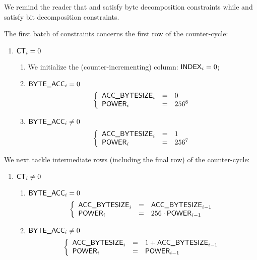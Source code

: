 \begin{center}
\end{center}

We remind the reader that
\genByte{} and \genByteAcc{} satisfy byte decomposition constraints while
\genBit{}  and \genBitAcc{}  satisfy bit  decomposition constraints.

The first batch of constraints concerns the first row of the counter-cycle:
\begin{enumerate}
	\item \If $\textsf{CT}_{i}=0$ \Then
		\begin{enumerate}
			\item We initialize the (counter-incrementing) \index{} column: \( \textsf{INDEX}_{i} = 0 \);
			\item \If $\textsf{BYTE}\textsf{\_}\textsf{ACC}_{i} = 0$ \Then 
				\[
					\left\{ \begin{array}{lcl}
						\textsf{ACC\_BYTESIZE}_{i}      & = & 0       \\
						\textsf{POWER}_{i}   & = & 256^{8} \\
					\end{array} \right.
				\]
			\item \If $\textsf{BYTE}\textsf{\_}\textsf{ACC}_{i} \ne 0$ \Then
				\[
					\left\{ \begin{array}{lcl}
						\textsf{ACC\_BYTESIZE}_{i}      & = & 1       \\
						\textsf{POWER}_{i}   & = & 256^{7} \\
					\end{array} \right.
				\]
		\end{enumerate}
\end{enumerate}
We next tackle intermediate rows (including the final row) of the counter-cycle:
\begin{enumerate}[resume]
	\item \If $\textsf{CT}_{i} \ne 0$ \Then
		\begin{enumerate}
			\item \If $\textsf{BYTE}\textsf{\_}\textsf{ACC}_{i} = 0$ \Then
				\[
					\left\{ \begin{array}{lcl}
						\textsf{ACC\_BYTESIZE}_{i}      & = & \textsf{ACC\_BYTESIZE}_{i - 1}              \\
						\textsf{POWER}_{i}   & = & 256 \cdot \textsf{POWER}_{i - 1} \\
					\end{array} \right.
				\]
			\item \If $\textsf{BYTE}\textsf{\_}\textsf{ACC}_{i} \ne 0$ \Then
				\[
					\left\{ \begin{array}{lcl}
						\textsf{ACC\_BYTESIZE}_{i}      & = & 1 + \textsf{ACC\_BYTESIZE}_{i - 1} \\
						\textsf{POWER}_{i}   & = & \textsf{POWER}_{i - 1}  \\
					\end{array} \right.
				\]
		\end{enumerate}
\end{enumerate}
